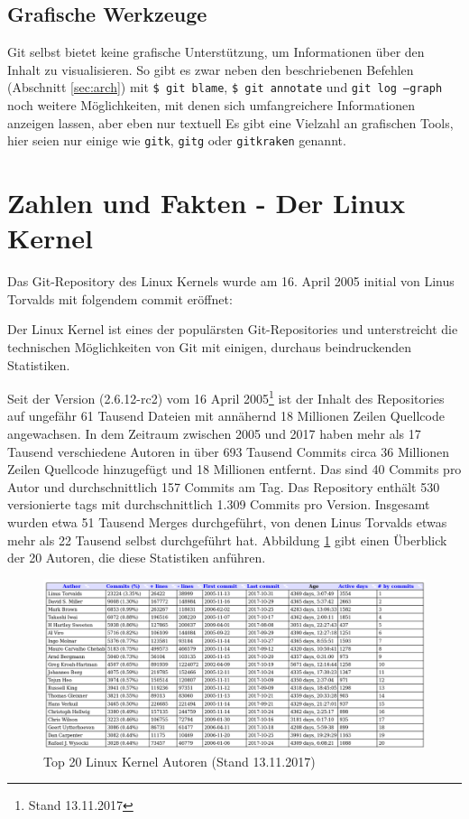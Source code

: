 \subsection{Grafische Werkzeuge}
Git selbst bietet keine grafische Unterstützung, um Informationen über den
Inhalt zu visualisieren. So gibt es zwar neben den beschriebenen Befehlen
(Abschnitt \ref{sec:arch}) mit \texttt{\$ git blame}, \texttt{\$ git annotate}
und \texttt{git log --graph} noch weitere Möglichkeiten, mit denen sich
umfangreichere Informationen anzeigen lassen, aber eben nur textuell Es gibt
eine Vielzahl an grafischen Tools, hier seien nur einige wie \texttt{gitk},
\texttt{gitg} oder \texttt{gitkraken} genannt. \cite[S.~302]{gitwf}

\section{Zahlen und Fakten - Der Linux Kernel}\label{sec:kernel}
Das Git-Repository des Linux Kernels wurde am 16. April 2005 initial von Linus
Torvalds mit folgendem \gls{commit} \cite{link:linuxgit} eröffnet:


Der Linux Kernel ist eines der populärsten Git-Repositories und unterstreicht
die technischen Möglichkeiten von Git mit einigen, durchaus beindruckenden
Statistiken.

Seit der Version (2.6.12-rc2) vom 16 April 2005\footnote{Stand 13.11.2017} ist
der Inhalt des Repositories auf ungefähr 61 Tausend Dateien mit annähernd
18 Millionen Zeilen Quellcode angewachsen. In dem Zeitraum zwischen 2005 und
2017 haben mehr als 17 Tausend verschiedene Autoren in über 693 Tausend Commits
circa 36 Millionen Zeilen Quellcode hinzugefügt und 18 Millionen entfernt. Das
sind 40 Commits pro Autor und durchschnittlich 157 Commits am Tag. Das
Repository enthält 530 versionierte \glspl{tag} mit durchschnittlich 1.309
Commits pro Version. Insgesamt wurden etwa 51 Tausend Merges durchgeführt, von
denen Linus Torvalds etwas mehr als 22 Tausend selbst durchgeführt hat.
Abbildung \ref{top20} gibt einen Überblick der 20 Autoren, die diese
Statistiken anführen.

\begin{figure}
	\centering
  \includegraphics[scale=0.40]{images/top_20_of_linux_authors.png}
	\caption{Top 20 Linux Kernel Autoren (Stand 13.11.2017)}
	\label{top20}
\end{figure}


